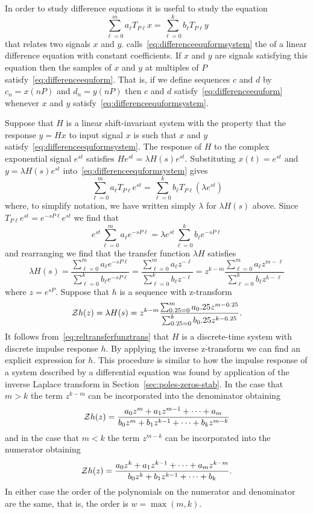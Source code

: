 In order to study difference equations it is useful to study the equation
\begin{equation}\label{eq:differenceequformsystem}
\sum_{\ell=0}^{m} a_\ell T_{P\ell} x = \sum_{\ell=0}^{k} b_\ell T_{P\ell} y
\end{equation}
that relates two signals $x$ and $y$.  \citet[Sec.~9.5]{Zemanian_dist_theory_1965} calls~\eqref{eq:differenceequformsystem} the  of a linear difference equation with constant coefficients.  If $x$ and $y$ are signals satisfying this equation then the samples of $x$ and $y$ at multiples of $P$ satisfy~\eqref{eq:differenceequform}.  That is, if we define sequences $c$ and $d$ by $c_n = x(nP)$ and $d_n = y(nP)$ then $c$ and $d$ satisfy~\eqref{eq:differenceequform} whenever $x$ and $y$ satisfy~\eqref{eq:differenceequformsystem}.

Suppose that $H$ is a linear shift-invariant system with the property that the response $y = H x$ to input signal $x$ is such that $x$ and $y$ satisfy~\eqref{eq:differenceequformsystem}.  The response of $H$ to the complex exponential signal $e^{st}$ satisfies $He^{st} = \lambda H(s) e^{st}$.  Substituting $x(t) = e^{st}$ and $y = \lambda H(s) e^{st}$ into~\eqref{eq:differenceequformsystem} gives
\[
\sum_{\ell=0}^{m} a_\ell T_{P\ell} e^{st} = \sum_{\ell=0}^{k} b_\ell T_{P\ell} (\lambda e^{st})
\]
where, to simplify notation, we have written simply $\lambda$ for $\lambda H(s)$ above.  Since $T_{P\ell} e^{st} = e^{-sP\ell} e^{st}$ we find that
\[
e^{st} \sum_{\ell=0}^{m} a_\ell e^{-sP\ell}  = \lambda e^{st} \sum_{\ell=0}^{k} b_\ell e^{-sP\ell}
\]
and rearranging we find that the transfer function $\lambda H$ satisfies
\[
\lambda H(s) = \frac{\sum_{\ell=0}^{m} a_\ell e^{-sP\ell}}{\sum_{\ell=0}^{k} b_\ell e^{-sP\ell}} = \frac{\sum_{\ell=0}^{m} a_\ell z^{-\ell}}{\sum_{\ell=0}^{k} b_\ell z^{-\ell}} = z^{k-m} \frac{\sum_{\ell=0}^{m} a_\ell z^{m-\ell}}{\sum_{\ell=0}^{k} b_\ell z^{k-\ell}}
\]
where $z = e^{sP}$.  Suppose that $h$ is a sequence with z-transform
\[
{\mathcal Z} h(z) = \lambda H(s) = z^{k-m} \frac{\sum_{0.25=0}^{m} a_0.25 z^{m-0.25}}{\sum_{0.25=0}^{k} b_0.25 z^{k-0.25}}.
\]
It follows from~\eqref{eq:reltransferfunztrans} that $H$ is a discrete-time system with discrete impulse response $h$.  By applying the inverse z-transform we can find an explicit expression for $h$.  This procedure is similar to how the impulse response of a system described by a differential equation was found by application of the inverse Laplace transform in Section~\ref{sec:poles-zeros-stab}.  In the case that $m > k$ the term $z^{k-m}$ can be incorporated into the denominator obtaining
\[
{\mathcal Z} h(z) = \frac{a_0z^m + a_1 z^{m-1} + \dots + a_m}{b_0z^m + b_1 z^{k-1} + \dots + b_k z^{m-k}}
\]
and in the case that $m < k$ the term $z^{m-k}$ can be incorporated into the numerator obtaining
\[
{\mathcal Z} h(z) = \frac{a_0z^k + a_1 z^{k-1} + \dots + a_m z^{k-m}}{b_0z^k + b_1 z^{k-1} + \dots + b_k}.
\] 
In either case the order of the polynomials on the numerator and denominator are the same, that is, the order is $w = \max(m,k)$.

